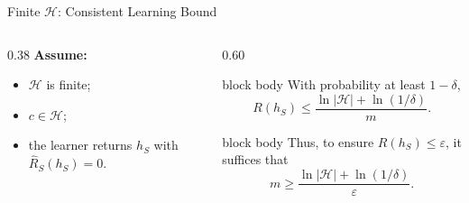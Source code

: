 \documentclass[aspectratio=169,10pt]{beamer}
\newcommand{\Hc}{\mathcal{H}}
\newcommand{\eps}{\varepsilon}
\begin{document}
\begin{frame}[t]{Finite $\Hc$: Consistent Learning Bound}
  \vspace{0.04cm}
  \begin{columns}[T,totalwidth=\textwidth]
    \begin{column}{0.38\textwidth}
      \textbf{Assume:}
      \begin{itemize}
        \setlength{\itemsep}{0.17cm}
        \item $\Hc$ is finite;
        \item $c\in\Hc$;
        \item the learner returns $h_S$ with $\widehat R_S(h_S)=0$.
      \end{itemize}
    \end{column}
    \begin{column}{0.60\textwidth}
      \begin{beamercolorbox}[rounded=true,sep=0.20cm,wd=\linewidth]{block body}
        With probability at least $1-\delta$,
        \[
          R(h_S)\le \frac{\ln|\Hc|+\ln(1/\delta)}{m}.
        \]
      \end{beamercolorbox}
      \vspace{0.10cm}
      \begin{beamercolorbox}[rounded=true,sep=0.18cm,wd=\linewidth]{block body}
        Thus, to ensure $R(h_S)\le\eps$, it suffices that
        \[
          \boxed{m\ge \frac{\ln|\Hc|+\ln(1/\delta)}{\eps}}.
        \]
      \end{beamercolorbox}
    \end{column}
  \end{columns}
\end{frame}
\end{document}
